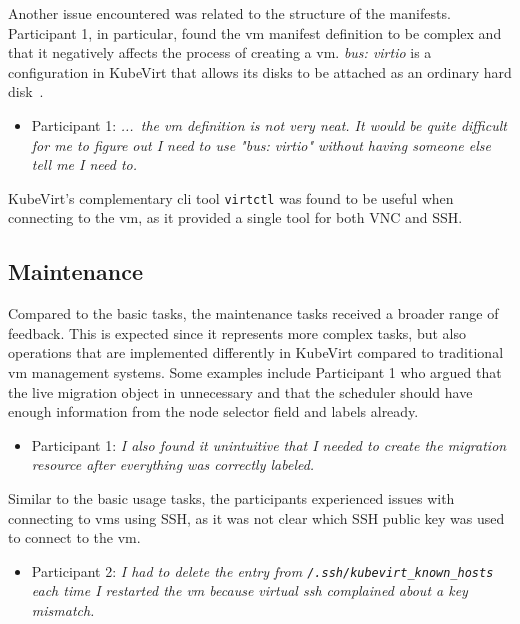 \documentclass{kththesis}
\begin{document}
\begin{enumerate}
Another issue encountered was related to the structure of the manifests. Participant 1, in particular, found the \Gls{vm} manifest definition to be complex and that it negatively affects the process of creating a \Gls{vm}. \textit{bus: virtio} is a configuration in KubeVirt that allows its disks to be attached as an ordinary hard disk\ \cite{kubevirt-docs-disks}.

\begin{itemize}
    \item Participant 1: \textit{...\ the \Gls{vm} definition is not very neat. It would be quite difficult for me to figure out I need to use "bus: virtio" without having someone else tell me I need to.}
\end{itemize}

KubeVirt's complementary \Gls{cli} tool \texttt{virtctl} was found to be useful when connecting to the \Gls{vm}, as it provided a single tool for both VNC and SSH.

\subsection{Maintenance}

Compared to the basic tasks, the maintenance tasks received a broader range of feedback. This is expected since it represents more complex tasks, but also operations that are implemented differently in KubeVirt compared to traditional \Gls{vm} management systems. Some examples include Participant 1 who argued that the live migration object in unnecessary and that the scheduler should have enough information from the node selector field and labels already. 

\begin{itemize}
    \item Participant 1: \textit{I also found it unintuitive that I needed to create the migration resource after everything was correctly labeled.}
\end{itemize}

Similar to the basic usage tasks, the participants experienced issues with connecting to \Glspl{vm} using SSH, as it was not clear which SSH public key was used to connect to the \Gls{vm}.

\begin{itemize}
    \item Participant 2: \textit{I had to delete the entry from \texttt{/.ssh/kubevirt\_known\_hosts} each time I restarted the \Gls{vm} because virtual ssh complained about a key mismatch.}
\end{itemize}


\end{enumerate}
\end{document}
